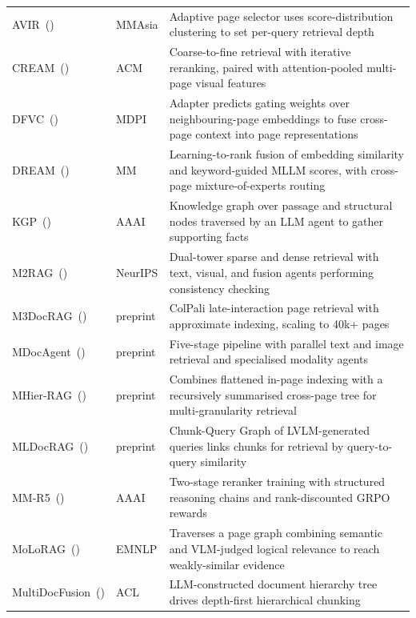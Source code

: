 \begin{table}[p]
\begin{tabularx}{\textwidth}{@{}l l >{\raggedright\arraybackslash}X@{}}
\rowcolor{sectionbg}
\multicolumn{3}{l}{\textbf{Retrieval-Augmented Pipelines}} \\
\midrule
  {AVIR}~(\citeyear{li2025avir}) & MMAsia & Adaptive page selector uses score-distribution clustering to set per-query retrieval depth \\
  {CREAM}~(\citeyear{zhang2024cream}) & ACM & Coarse-to-fine retrieval with iterative reranking, paired with attention-pooled multi-page visual features \\
  {DFVC}~(\citeyear{qian2026accurate}) & MDPI & Adapter predicts gating weights over neighbouring-page embeddings to fuse cross-page context into page representations \\
  {DREAM}~(\citeyear{zhang2025dream}) & MM & Learning-to-rank fusion of embedding similarity and keyword-guided MLLM scores, with cross-page mixture-of-experts routing \\
  {KGP}~(\citeyear{wang2024knowledge}) & AAAI & Knowledge graph over passage and structural nodes traversed by an LLM agent to gather supporting facts \\
  {M2RAG}~(\citeyear{duan2025m2rag}) & NeurIPS & Dual-tower sparse and dense retrieval with text, visual, and fusion agents performing consistency checking \\
  {M3DocRAG}~(\citeyear{cho2024m3docrag}) & preprint & ColPali late-interaction page retrieval with approximate indexing, scaling to 40k+ pages \\
  {MDocAgent}~(\citeyear{han2025mdocagent}) & preprint & Five-stage pipeline with parallel text and image retrieval and specialised modality agents \\
  {MHier-RAG}~(\citeyear{gong2025mhier}) & preprint & Combines flattened in-page indexing with a recursively summarised cross-page tree for multi-granularity retrieval \\
  {MLDocRAG}~(\citeyear{zhang2026mldocrag}) & preprint & Chunk-Query Graph of LVLM-generated queries links chunks for retrieval by query-to-query similarity \\
  {MM-R5}~(\citeyear{xu2026mmr5}) & AAAI & Two-stage reranker training with structured reasoning chains and rank-discounted GRPO rewards \\
  {MoLoRAG}~(\citeyear{wu2025molorag}) & EMNLP & Traverses a page graph combining semantic and VLM-judged logical relevance to reach weakly-similar evidence \\
  {MultiDocFusion}~(\citeyear{shin2025multidocfusion}) & ACL & LLM-constructed document hierarchy tree drives depth-first hierarchical chunking \\

\end{tabularx}
\end{table}
